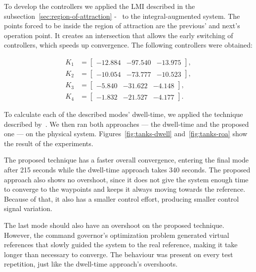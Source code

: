 To develop the controllers we applied the LMI described in the
subsection~\ref{sec:region-of-attraction} -~
to the integral-augmented system. The points forced to be inside the region of
attraction are the previous' and next's operation point. It creates an
intersection that allows the early switching of controllers, which speeds up
convergence. The following controllers were obtained:

\begin{align}
  K_{1} & = \begin{bmatrix} -12.884 & -97.540 & -13.975 \end{bmatrix}, \\
  K_{2} & = \begin{bmatrix} -10.054 & -73.777 & -10.523 \end{bmatrix}, \\
  K_{3} & = \begin{bmatrix} -5.840  & -31.622 & -4.148 \end{bmatrix}, \\
  K_{4} & = \begin{bmatrix} -1.832  & -21.527 & -4.177 \end{bmatrix}.
\end{align}

To calculate each of the described modes' dwell-time, we applied the technique
described by~\textcite{franzè.lucia.ea:command}. We then ran both approaches ---
the dwell-time and the proposed one --- on the physical system.
Figures~\ref{fig:tanks-dwell} and~\ref{fig:tanks-roa} show the result of the
experiments.

The proposed technique has a faster overall convergence, entering the final mode
after 215 seconds while the dwell-time approach takes 340 seconds. The proposed
approach also shows no overshoot, since it does not give the system enough time
to converge to the waypoints and keeps it always moving towards the reference.
Because of that, it also has a smaller control effort, producing smaller control
signal variation.

The last mode should also have an overshoot on the proposed technique. However,
the command governor's optimization problem generated virtual references that
slowly guided the system to the real reference, making it take longer than
necessary to converge. The behaviour was present on every test repetition, just
like the dwell-time approach's overshoots.


